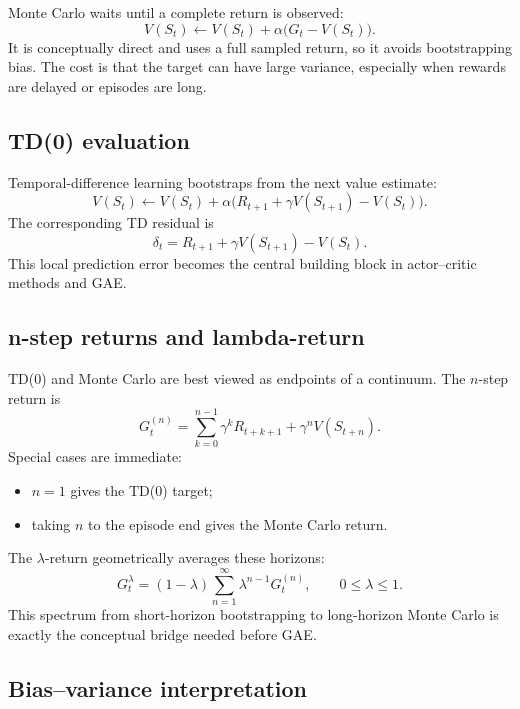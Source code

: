 \documentclass[11pt]{article}
\newcommand{\1}{\mathbf{1}}
\begin{document}
Monte Carlo waits until a complete return is observed:
\begin{equation}
V(S_t) \leftarrow V(S_t)+\alpha\bigl(G_t-V(S_t)\bigr).
\end{equation}
It is conceptually direct and uses a full sampled return, so it avoids bootstrapping bias. The cost is that the target can have large variance, especially when rewards are delayed or episodes are long.

\subsection{TD(0) evaluation}

Temporal-difference learning bootstraps from the next value estimate:
\begin{equation}
V(S_t) \leftarrow V(S_t)+\alpha\bigl(R_{t+1}+\gamma V(S_{t+1})-V(S_t)\bigr).
\end{equation}
The corresponding TD residual is
\begin{equation}
\delta_t = R_{t+1}+\gamma V(S_{t+1})-V(S_t).
\end{equation}
This local prediction error becomes the central building block in actor--critic methods and GAE.

\subsection{n-step returns and lambda-return}

TD(0) and Monte Carlo are best viewed as endpoints of a continuum. The $n$-step return is
\begin{equation}
G_t^{(n)} = \sum_{k=0}^{n-1}\gamma^k R_{t+k+1} + \gamma^n V(S_{t+n}).
\end{equation}
Special cases are immediate:
\begin{itemize}
    \item $n=1$ gives the TD(0) target;
    \item taking $n$ to the episode end gives the Monte Carlo return.
\end{itemize}
The $\lambda$-return geometrically averages these horizons:
\begin{equation}
G_t^{\lambda}=(1-\lambda)\sum_{n=1}^{\infty}\lambda^{n-1}G_t^{(n)}, \qquad 0\le \lambda \le 1.
\end{equation}
This spectrum from short-horizon bootstrapping to long-horizon Monte Carlo is exactly the conceptual bridge needed before GAE.

\subsection{Bias--variance interpretation}
\end{document}

